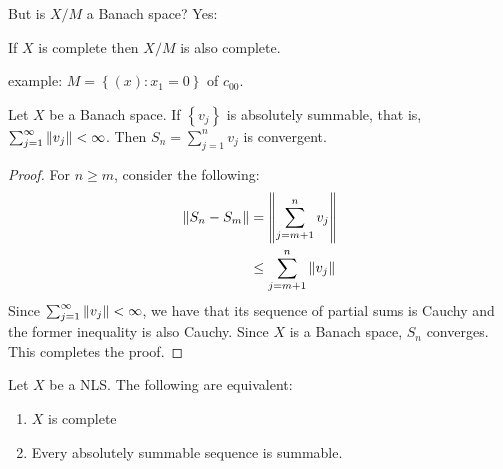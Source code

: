 But is $X/M$ a Banach space? Yes:
\begin{proposition}
    If $X$ is complete then $X/M$ is also complete.
    \label{prop:quotient-are-complete}
\end{proposition}

example: $M=\left\{ \left( x \right) : x_{1} =0 \right\}$ of $c_{00}$.

\begin{lemma}
    Let $X$ be a Banach space. If $\left\{ v_{j} \right\}$ is absolutely summable, that is, $\sum_{j=1}^{\infty} \left\lVert v_{j} \right\rVert < \infty$. Then $S_{n} = \sum_{j=1}^{n} v_{j}$ is convergent. 
    \label{lemma:Banach-absolutely-summable}
\end{lemma}
\begin{proof}
    For $n \ge m$, consider the following:
    \begin{align*}
	\left\lVert S_{n} - S_{m} \right\rVert &= \left\lVert \sum_{j=m+1}^{n} v_{j} \right\rVert \\
	& \le  \sum_{j=m+1}^{n} \left\lVert v_{j} \right\rVert
    \end{align*}
    Since $\sum_{j=1}^{\infty} \left\lVert v_j \right\rVert < \infty$, we have that its sequence of partial sums is Cauchy and the former inequality is also Cauchy. Since $X$ is a Banach space, $S_{n}$ converges. This completes the proof.
\end{proof}

\begin{theorem}
    Let $X$ be a NLS. The following are equivalent:
    \begin{enumerate}
	\item $X$ is complete
	\item Every absolutely summable sequence is summable.
    \end{enumerate}
    \label{thm:equivalent-thm}
\end{theorem}
